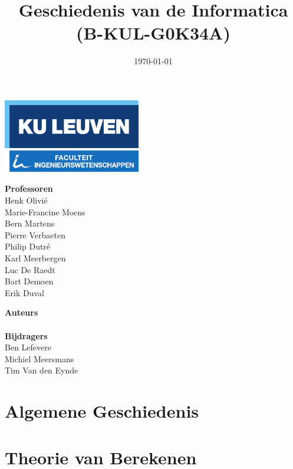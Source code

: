 \documentclass[11pt]{article}
\title{Geschiedenis van de Informatica \\ (B-KUL-G0K34A)}
\date{\today}
\author{\theauthors}
\newcommand{\thecontributors}{Ben Lefevere \\ Michiel Meersmans \\ Tim Van den Eynde}
\newcommand{\theprofs}{Henk Olivi\'e \\ Marie-Francine Moens \\ Bern Martens \\ Pierre Verbaeten \\ Philip Dutr\'e \\ Karl Meerbergen \\ Luc De Raedt \\ Bart Demoen \\ Erik Duval}
\theoremstyle{definition}
\begin{document}

\begin{titlepage}

\thispagestyle{empty}

\begin{minipage}{\textwidth}
	\includegraphics[width=60mm]{logokuleng.pdf}
\end{minipage}

\vspace{40mm}

\begin{minipage}{\textwidth}
	\Huge
	\sffamily
	\thetitle
\end{minipage}

\vspace{50mm}

\hfill
\begin{minipage}[t]{0.5\textwidth}
	\Large
	\sffamily
	\textbf{Professoren} \\
	\theprofs
\end{minipage}%
\begin{minipage}[t]{0.5\textwidth}
\begin{flushright}
	\Large
	\sffamily
	\textbf{Auteurs} \\
	\theauthor
	\vspace{10mm} \\
	\textbf{Bijdragers} \\
	\thecontributors
\end{flushright}
\end{minipage}
\vfill
\end{titlepage}

\newpage

\tableofcontents

\newpage

\section{Algemene Geschiedenis}



\newpage

\section{Theorie van Berekenen}

\newpage
\end{document}
